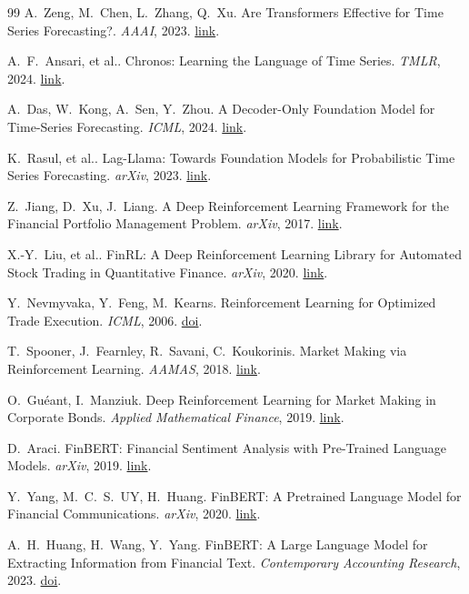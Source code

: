 \begin{thebibliography}{99}
 A.~Zeng, M.~Chen, L.~Zhang, Q.~Xu. Are Transformers Effective for Time Series Forecasting?. \emph{AAAI}, 2023. \href{https://arxiv.org/abs/2205.13504}{link}.

 A.~F.~Ansari, et al.. Chronos: Learning the Language of Time Series. \emph{TMLR}, 2024. \href{https://arxiv.org/abs/2403.07815}{link}.

 A.~Das, W.~Kong, A.~Sen, Y.~Zhou. A Decoder-Only Foundation Model for Time-Series Forecasting. \emph{ICML}, 2024. \href{https://arxiv.org/abs/2310.10688}{link}.

 K.~Rasul, et al.. Lag-Llama: Towards Foundation Models for Probabilistic Time Series Forecasting. \emph{arXiv}, 2023. \href{https://arxiv.org/abs/2310.08278}{link}.

 Z.~Jiang, D.~Xu, J.~Liang. A Deep Reinforcement Learning Framework for the Financial Portfolio Management Problem. \emph{arXiv}, 2017. \href{https://arxiv.org/abs/1706.10059}{link}.

 X.-Y.~Liu, et al.. FinRL: A Deep Reinforcement Learning Library for Automated Stock Trading in Quantitative Finance. \emph{arXiv}, 2020. \href{https://arxiv.org/abs/2011.09607}{link}.

 Y.~Nevmyvaka, Y.~Feng, M.~Kearns. Reinforcement Learning for Optimized Trade Execution. \emph{ICML}, 2006. \href{https://doi.org/10.1145/1143844.1143929}{doi}.

 T.~Spooner, J.~Fearnley, R.~Savani, C.~Koukorinis. Market Making via Reinforcement Learning. \emph{AAMAS}, 2018. \href{https://arxiv.org/abs/1804.04216}{link}.

 O.~Gu\'eant, I.~Manziuk. Deep Reinforcement Learning for Market Making in Corporate Bonds. \emph{Applied Mathematical Finance}, 2019. \href{https://arxiv.org/abs/1910.13205}{link}.

 D.~Araci. FinBERT: Financial Sentiment Analysis with Pre-Trained Language Models. \emph{arXiv}, 2019. \href{https://arxiv.org/abs/1908.10063}{link}.

 Y.~Yang, M.~C.~S.~UY, H.~Huang. FinBERT: A Pretrained Language Model for Financial Communications. \emph{arXiv}, 2020. \href{https://arxiv.org/abs/2006.08097}{link}.

 A.~H.~Huang, H.~Wang, Y.~Yang. FinBERT: A Large Language Model for Extracting Information from Financial Text. \emph{Contemporary Accounting Research}, 2023. \href{https://doi.org/10.1111/1911-3846.12832}{doi}.


\end{thebibliography}
